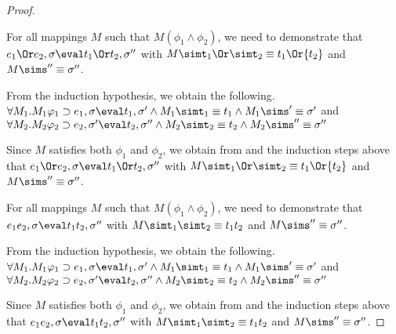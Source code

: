\begin{proof}
{  }

  {For all mappings $M$ such that $M(\phi_1\wedge \phi_2)$, we need to demonstrate that
   $e_1\Or e_2,\sigma\eval t_1\Or t_2,\sigma''$ with $M \simt_1\Or \simt_2 \equiv {t_1}\Or{t_2}$ and $M\sims''\equiv{\sigma''}$.

  From the induction hypothesis, we obtain the following.\\
  $\forall M_1 .  M_1\phi_1 \implies e_1, \sigma {\eval}{t_1},{\sigma'}\land  M_1 \simt_1\equiv {t_1} \land  M_1\sims'\equiv{\sigma'}$ and
  $\forall M_2 . M_2\phi_2 \implies e_2,\sigma' {\eval}{t_2},{\sigma''}\land M_2\simt_2\equiv {t_2} \land M_2\sims''\equiv{\sigma''}$

  Since $M$ satisfies both $\phi_1$ and $\phi_2$, we obtain from  and the induction steps above that $e_1\Or e_2,\sigma\eval t_1\Or t_2,\sigma''$ with $M \simt_1\Or \simt_2 \equiv {t_1}\Or{t_2}$ and $M \sims'' \equiv{\sigma''}$.

  }

    {For all mappings $M$ such that $M(\phi_1\wedge \phi_2)$, we need to demonstrate that
     $e_1\And e_2,\sigma\eval t_1\And t_2,\sigma''$ with $M \simt_1\And \simt_2 \equiv {t_1}\And{t_2}$ and $M\sims''\equiv{\sigma''}$.

    From the induction hypothesis, we obtain the following.\\
    $\forall M_1 .  M_1\phi_1 \implies e_1, \sigma {\eval}{t_1},{\sigma'}\land  M_1 \simt_1\equiv {t_1} \land  M_1\sims'\equiv{\sigma'}$ and
    $\forall M_2 . M_2\phi_2 \implies e_2,\sigma' {\eval}{t_2},{\sigma''}\land M_2\simt_2\equiv {t_2} \land M_2\sims''\equiv{\sigma''}$

    Since $M$ satisfies both $\phi_1$ and $\phi_2$, we obtain from  and the induction steps above that $e_1\And e_2,\sigma\eval t_1\And t_2,\sigma''$ with $M \simt_1\And \simt_2 \equiv {t_1}\And{t_2}$ and $M \sims'' \equiv{\sigma''}$.

    }

\end{proof}


